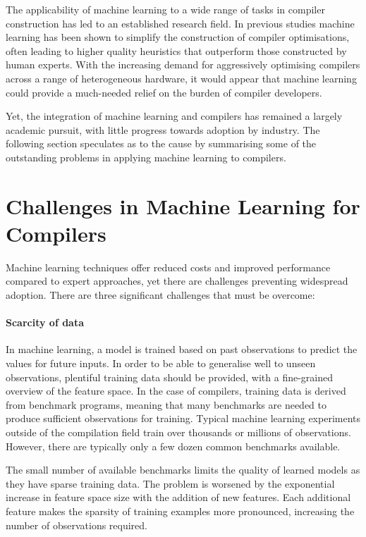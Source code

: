 The applicability of machine learning to a wide range of tasks in compiler construction has led to an established research field. In previous studies machine learning has been shown to simplify the construction of compiler optimisations, often leading to higher quality heuristics that outperform those constructed by human experts. With the increasing demand for aggressively optimising compilers across a range of heterogeneous hardware, it would appear that machine learning could provide a much-needed relief on the burden of compiler developers.

Yet, the integration of machine learning and compilers has remained a largely academic pursuit, with little progress towards adoption by industry. The following section speculates as to the cause by summarising some of the outstanding problems in applying machine learning to compilers.


\section{Challenges in Machine Learning for Compilers}

Machine learning techniques offer reduced costs and improved performance compared to expert approaches, yet there are challenges preventing widespread adoption. There are three significant challenges that must be overcome:

\paragraph*{Scarcity of data} In machine learning, a model is trained based on past observations to predict the values for future inputs. In order to be able to generalise well to unseen observations, plentiful training data should be provided, with a fine-grained overview of the feature space. In the case of compilers, training data is derived from benchmark programs, meaning that many benchmarks are needed to produce sufficient observations for training. Typical machine learning experiments outside of the compilation field train over thousands or millions of observations. However, there are typically only a few dozen common benchmarks available.

The small number of available benchmarks limits the quality of learned models as they have sparse training data. The problem is worsened by the exponential increase in feature space size with the addition of new features. Each additional feature makes the sparsity of training examples more pronounced, increasing the number of observations required.

